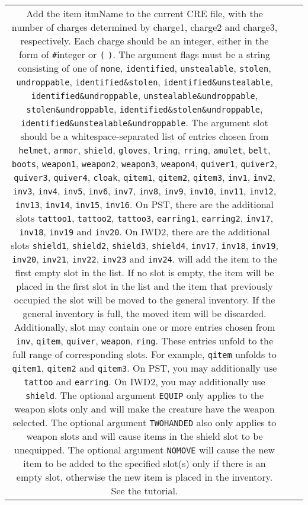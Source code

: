 \documentclass{article}
\def\ttref#1{\ahrefloc{#1}{\tt #1}}
\def\t#1{{\tt #1}}
\begin{document}
\begin{tabular}{cp{10in}|p{10in}}
Add the item itmName to the current CRE file, with the number of
charges determined by charge1, charge2 and charge3, respectively. Each
charge should be an integer, either in the form of \t{\#}integer or
\t{(} \ttref{value} \t{)}. The argument flags must be a string
consisting of one of \t{none}, \t{identified}, \t{unstealable},
\t{stolen}, \t{undroppable}, \t{identified\&stolen},
\t{identified\&unstealable}, \t{identified\&undroppable},
\t{unstealable\&undroppable}, \t{stolen\&undroppable},
\t{identified\&stolen\&undroppable},
\t{identified\&unstealable\&undroppable}. The argument slot should be
a whitespace-separated list of entries chosen from \t{helmet},
\t{armor}, \t{shield}, \t{gloves}, \t{lring}, \t{rring}, \t{amulet},
\t{belt}, \t{boots}, \t{weapon1}, \t{weapon2}, \t{weapon3},
\t{weapon4}, \t{quiver1}, \t{quiver2}, \t{quiver3}, \t{quiver4},
\t{cloak}, \t{qitem1}, \t{qitem2}, \t{qitem3}, \t{inv1}, \t{inv2},
\t{inv3}, \t{inv4}, \t{inv5}, \t{inv6}, \t{inv7}, \t{inv8}, \t{inv9},
\t{inv10}, \t{inv11}, \t{inv12}, \t{inv13}, \t{inv14}, \t{inv15},
\t{inv16}. On PST, there are the additional slots \t{tattoo1},
\t{tattoo2}, \t{tattoo3}, \t{earring1}, \t{earring2}, \t{inv17},
\t{inv18}, \t{inv19} and \t{inv20}. On IWD2, there are the additional
slots \t{shield1}, \t{shield2}, \t{shield3}, \t{shield4}, \t{inv17},
\t{inv18}, \t{inv19}, \t{inv20}, \t{inv21}, \t{inv22}, \t{inv23} and
\t{inv24}. \ttref{ADD!CRE!ITEM} will add the item to the first empty slot in
the list. If no slot is empty, the item will be placed in the first
slot in the list and the item that previously occupied the slot will
be moved to the general inventory. If the general inventory is full,
the moved item will be discarded. Additionally, slot may contain one
or more entries chosen from \t{inv}, \t{qitem}, \t{quiver},
\t{weapon}, \t{ring}. These entries unfold to the full range of
corresponding slots. For example, \t{qitem} unfolds to \t{qitem1},
\t{qitem2} and \t{qitem3}. On PST, you may additionally use \t{tattoo}
and \t{earring}. On IWD2, you may additionally use \t{shield}. The
optional argument \t{EQUIP} only applies to the weapon slots only and
will make the creature have the weapon selected. The optional argument
\t{TWOHANDED} also only applies to weapon slots and will cause items
in the shield slot to be unequipped. The optional argument \t{NOMOVE}
will cause the new item to be added to the specified slot(s) only if
there is an empty slot, otherwise the new item is placed in the
inventory. See the \ttref{ADD!CRE!ITEM} tutorial. \\


\end{tabular}
\end{document}
